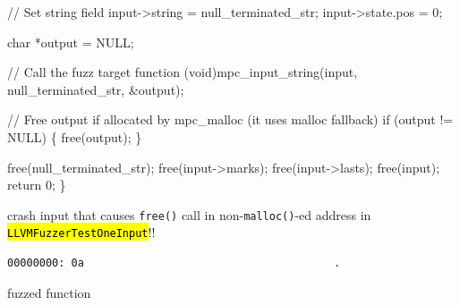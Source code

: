 \documentclass[
  a4paper,
]{scrreprt}
\newenvironment{Shaded}{\begin{snugshade}}{\end{snugshade}}
\newcommand{\CommentTok}[1]{\textcolor[rgb]{0.41,0.41,0.41}{#1}}
\newcommand{\ControlFlowTok}[1]{\textcolor[rgb]{0.85,0.12,0.09}{#1}}
\newcommand{\DataTypeTok}[1]{\textcolor[rgb]{0.47,0.16,0.63}{#1}}
\newcommand{\DecValTok}[1]{\textcolor[rgb]{0.47,0.16,0.63}{#1}}
\newcommand{\NormalTok}[1]{\textcolor[rgb]{0.33,0.33,0.33}{#1}}
\newcommand{\OperatorTok}[1]{\textcolor[rgb]{0.00,0.46,0.62}{#1}}
\theoremstyle{definition}
\theoremstyle{remark}
\begin{document}
\begin{Shaded}
\begin{Highlighting}[numbers=left,,]
  \CommentTok{// Set string field}
\NormalTok{  input}\OperatorTok{{-}\textgreater{}}\NormalTok{string }\OperatorTok{=}\NormalTok{ null\_terminated\_str}\OperatorTok{;}
\NormalTok{  input}\OperatorTok{{-}\textgreater{}}\NormalTok{state}\OperatorTok{.}\NormalTok{pos }\OperatorTok{=} \DecValTok{0}\OperatorTok{;}

  \DataTypeTok{char} \OperatorTok{*}\NormalTok{output }\OperatorTok{=}\NormalTok{ NULL}\OperatorTok{;}

  \CommentTok{// Call the fuzz target function}
  \OperatorTok{(}\DataTypeTok{void}\OperatorTok{)}\NormalTok{mpc\_input\_string}\OperatorTok{(}\NormalTok{input}\OperatorTok{,}\NormalTok{ null\_terminated\_str}\OperatorTok{,} \OperatorTok{\&}\NormalTok{output}\OperatorTok{);}

  \CommentTok{// Free output if allocated by mpc\_malloc (it uses malloc fallback)}
  \ControlFlowTok{if} \OperatorTok{(}\NormalTok{output }\OperatorTok{!=}\NormalTok{ NULL}\OperatorTok{)} \OperatorTok{\{}
\NormalTok{    free}\OperatorTok{(}\NormalTok{output}\OperatorTok{);}
  \OperatorTok{\}}

\NormalTok{  free}\OperatorTok{(}\NormalTok{null\_terminated\_str}\OperatorTok{);}
\NormalTok{  free}\OperatorTok{(}\NormalTok{input}\OperatorTok{{-}\textgreater{}}\NormalTok{marks}\OperatorTok{);}
\NormalTok{  free}\OperatorTok{(}\NormalTok{input}\OperatorTok{{-}\textgreater{}}\NormalTok{lasts}\OperatorTok{);}
\NormalTok{  free}\OperatorTok{(}\NormalTok{input}\OperatorTok{);}
  \ControlFlowTok{return} \DecValTok{0}\OperatorTok{;}
\OperatorTok{\}}
\end{Highlighting}
\end{Shaded}

crash input that causes \texttt{free()} call in non-\texttt{malloc()}-ed
address in \hl{\mbox{\texttt{LLVMFuzzerTestOneInput}}}!!

\begin{verbatim}
00000000: 0a                                       .
\end{verbatim}

fuzzed function
\end{document}
